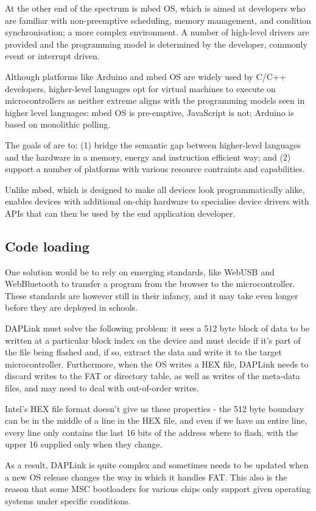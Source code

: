 At the other end of the spectrum is mbed OS, which is aimed at developers who are familiar 
with non-preemptive scheduling, memory management, and condition synchronisation; a more 
complex environment. A number of high-level drivers are provided and the programming model 
is determined by the developer, commonly event or interrupt driven.

Although platforms like Arduino and mbed OS are widely used by C/C++ developers, 
higher-level languages opt for virtual machines to execute on microcontrollers 
as neither extreme aligns with the programming models seen in higher level languages: 
mbed OS is pre-emptive, JavaScript is not; Arduino is based on monolithic polling. 

The goals of \CO are to: (1) bridge the semantic gap between 
higher-level languages and the hardware in a memory, energy and instruction 
efficient way; and (2) support a number of platforms with various
resource contraints and capabilities.

Unlike mbed, which is designed to make all devices look programmatically alike,
\CO enables devices with additional on-chip hardware to specialise device drivers 
with APIs that can then be used by the end application developer.



\subsection{Code loading}

One solution would be to rely on emerging standards, like WebUSB and WebBluetooth to transfer a program from the browser 
to the microcontroller. These standards are however still in their infancy, and it may take even longer before they are 
deployed in schools.

DAPLink must solve the following problem: it sees a 512 byte block of data to be written
at a particular block index on the device and must decide if it's part of the file being flashed and, if so, extract
the data and write it to the target microcontroller. Furthermore, when the OS writes a HEX file, DAPLink needs to discard
writes to the FAT or directory table, as well as writes of the meta-data files, and may need to deal with out-of-order writes.

Intel's HEX file format doesn't give us these properties 
- the 512 byte boundary can be in the middle of a line in the HEX file, 
and even if we have an entire line, every line only
contains the last 16 bits of the address where to flash, 
with the upper 16 supplied only when they change.

As a result, DAPLink is quite complex and sometimes needs to be updated when a new OS release changes the way
in which it handles FAT. 
This also is the reason that some MSC bootloaders for various chips only support given operating
systems under specific conditions.


